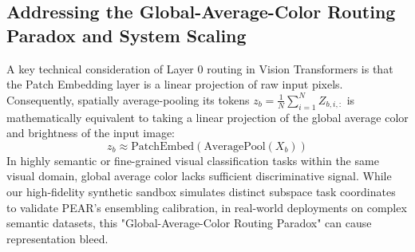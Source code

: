 \subsection{Addressing the Global-Average-Color Routing Paradox and System Scaling}
A key technical consideration of Layer 0 routing in Vision Transformers is that the Patch Embedding layer is a linear projection of raw input pixels. Consequently, spatially average-pooling its tokens $z_b = \frac{1}{N} \sum_{i=1}^N Z_{b, i, :}$ is mathematically equivalent to taking a linear projection of the global average color and brightness of the input image:
\begin{equation}
    z_b \approx \text{PatchEmbed}\left(\text{AveragePool}(X_b)\right)
\end{equation}
In highly semantic or fine-grained visual classification tasks within the same visual domain, global average color lacks sufficient discriminative signal. While our high-fidelity synthetic sandbox simulates distinct subspace task coordinates to validate PEAR's ensembling calibration, in real-world deployments on complex semantic datasets, this "Global-Average-Color Routing Paradox" can cause representation bleed.

